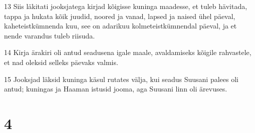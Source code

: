 \par 13 Siis läkitati jooksjatega kirjad kõigisse kuninga maadesse, et tuleb hävitada, tappa ja hukata kõik juudid, noored ja vanad, lapsed ja naised ühel päeval, kaheteistkümnenda kuu, see on adarikuu kolmeteistkümnendal päeval, ja et nende varandus tuleb riisuda.
\par 14 Kirja ärakiri oli antud seadusena igale maale, avaldamiseks kõigile rahvastele, et nad oleksid selleks päevaks valmis.
\par 15 Jooksjad läksid kuninga käsul rutates välja, kui seadus Suusani palees oli antud; kuningas ja Haaman istusid jooma, aga Suusani linn oli ärevuses.

\chapter{4}

